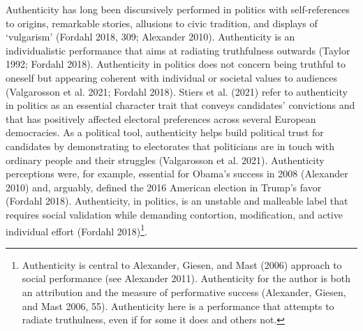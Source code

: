 \documentclass[
  12pt,
]{article}
\begin{document}
Authenticity has long been discursively performed in politics with
self-references to origins, remarkable stories, allusions to civic
tradition, and displays of `vulgarism' (Fordahl 2018, 309; Alexander
2010). Authenticity is an individualistic performance that aims at
radiating truthfulness outwards (Taylor 1992; Fordahl 2018).
Authenticity in politics does not concern being truthful to oneself but
appearing coherent with individual or societal values to audiences
(Valgarosson et al. 2021; Fordahl 2018). Stiers et al. (2021) refer to
authenticity in politics as an essential character trait that conveys
candidates' convictions and that has positively affected electoral
preferences across several European democracies. As a political tool,
authenticity helps build political trust for candidates by demonstrating
to electorates that politicians are in touch with ordinary people and
their struggles (Valgarosson et al. 2021). Authenticity perceptions
were, for example, essential for Obama's success in 2008 (Alexander
2010) and, arguably, defined the 2016 American election in Trump's favor
(Fordahl 2018). Authenticity, in politics, is an unstable and malleable
label that requires social validation while demanding contortion,
modification, and active individual effort (Fordahl 2018)\footnote{
  Authenticity is central to Alexander, Giesen, and Mast (2006) approach
  to social performance (see Alexander 2011). Authenticity for the
  author is both an attribution and the measure of performative success
  (Alexander, Giesen, and Mast 2006, 55). Authenticity here is a
  performance that attempts to radiate truthulness, even if for some it
  does and others not.}.
\end{document}
